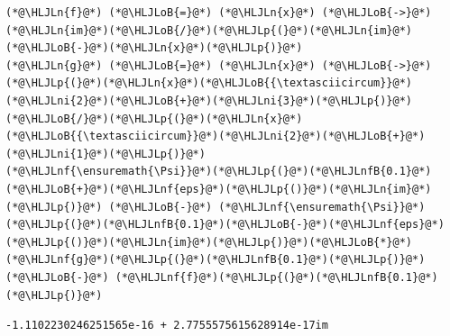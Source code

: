 \documentclass[12pt,a4paper]{article}
\newcommand{\HLJLn}[1]{#1}
\newcommand{\HLJLnf}[1]{\textcolor[RGB]{66,102,213}{#1}}
\newcommand{\HLJLnfB}[1]{\textcolor[RGB]{59,151,46}{#1}}
\newcommand{\HLJLni}[1]{\textcolor[RGB]{59,151,46}{#1}}
\newcommand{\HLJLoB}[1]{\textcolor[RGB]{102,102,102}{\textbf{#1}}}
\newcommand{\HLJLp}[1]{#1}
\begin{document}
\begin{lstlisting}
(*@\HLJLn{f}@*) (*@\HLJLoB{=}@*) (*@\HLJLn{x}@*) (*@\HLJLoB{->}@*) (*@\HLJLn{im}@*)(*@\HLJLoB{/}@*)(*@\HLJLp{(}@*)(*@\HLJLn{im}@*)(*@\HLJLoB{-}@*)(*@\HLJLn{x}@*)(*@\HLJLp{)}@*)
(*@\HLJLn{g}@*) (*@\HLJLoB{=}@*) (*@\HLJLn{x}@*) (*@\HLJLoB{->}@*) (*@\HLJLp{(}@*)(*@\HLJLn{x}@*)(*@\HLJLoB{{\textasciicircum}}@*)(*@\HLJLni{2}@*)(*@\HLJLoB{+}@*)(*@\HLJLni{3}@*)(*@\HLJLp{)}@*)(*@\HLJLoB{/}@*)(*@\HLJLp{(}@*)(*@\HLJLn{x}@*)(*@\HLJLoB{{\textasciicircum}}@*)(*@\HLJLni{2}@*)(*@\HLJLoB{+}@*)(*@\HLJLni{1}@*)(*@\HLJLp{)}@*)
(*@\HLJLnf{\ensuremath{\Psi}}@*)(*@\HLJLp{(}@*)(*@\HLJLnfB{0.1}@*)(*@\HLJLoB{+}@*)(*@\HLJLnf{eps}@*)(*@\HLJLp{()}@*)(*@\HLJLn{im}@*)(*@\HLJLp{)}@*) (*@\HLJLoB{-}@*) (*@\HLJLnf{\ensuremath{\Psi}}@*)(*@\HLJLp{(}@*)(*@\HLJLnfB{0.1}@*)(*@\HLJLoB{-}@*)(*@\HLJLnf{eps}@*)(*@\HLJLp{()}@*)(*@\HLJLn{im}@*)(*@\HLJLp{)}@*)(*@\HLJLoB{*}@*)(*@\HLJLnf{g}@*)(*@\HLJLp{(}@*)(*@\HLJLnfB{0.1}@*)(*@\HLJLp{)}@*) (*@\HLJLoB{-}@*) (*@\HLJLnf{f}@*)(*@\HLJLp{(}@*)(*@\HLJLnfB{0.1}@*)(*@\HLJLp{)}@*)
\end{lstlisting}

\begin{lstlisting}
-1.1102230246251565e-16 + 2.7755575615628914e-17im
\end{lstlisting}
\end{document}
